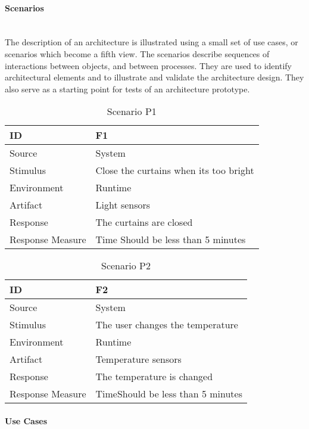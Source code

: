 \documentclass[../document]{subfiles}
\begin{document}
\paragraph{Scenarios} \ \\
The description of an architecture is illustrated using a small set of use cases, or scenarios which become a fifth view. The scenarios describe sequences of interactions between objects, and between processes. They are used to identify architectural elements and to illustrate and validate the architecture design. They also serve as a starting point for tests of an architecture prototype.

\begin{table}[H]
	\caption{Scenario P1}
	\begin{tabularx}{\textwidth}{|X|X|}
		\hline
		ID					& F1 \\ \hline
		Source				& System \\ \hline
		Stimulus			& Close the curtains when its too bright \\ \hline
		Environment			& Runtime \\ \hline
		Artifact			& Light sensors \\ \hline
		Response			& The curtains are closed \\ \hline
		Response Measure	& Time \newline Should be less than 5 minutes
		\\ \hline
	\end{tabularx}
\end{table}

\begin{table}[H]
	\caption{Scenario P2}
	\begin{tabularx}{\textwidth}{|X|X|}
		\hline
		ID					& F2 \\ \hline
		Source				& System \\ \hline
		Stimulus			& The user changes the temperature \\ \hline
		Environment			& Runtime \\ \hline
		Artifact			& Temperature sensors \\ \hline
		Response			& The temperature is changed \\ \hline
		Response Measure	& Time\newline Should be less than 5 minutes
		\\ \hline
	\end{tabularx}
\end{table}


\paragraph{Use Cases} \ \\
\end{document}
